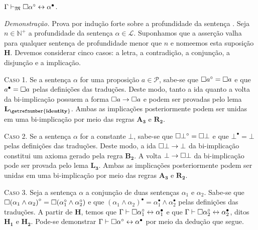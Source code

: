 \vspace{.5\baselineskip}
\begin{tcolorbox}[enhanced jigsaw, breakable, sharp corners, colframe=black, colback=white, boxrule=0.5pt, left=1.5mm, right=1.5mm, top=1.5mm, bottom=1.5mm]
\begin{theorem}\label{biimplication}
    $\Gamma\mathrel{\vdash}_\mathfrak{M}\Box\alpha^\circ\leftrightarrow\alpha^\bullet$.
\end{theorem}

        \emph{Demonstração.}
        Prova por indução forte sobre a profundidade da sentença \citep{Troelstra+Schwichtenberg.2000}.
        Seja $n\in\mathbb{N}^+$ a profundidade da sentença $\alpha\in\mathcal{L}$.
        Suponhamos que a asserção valha para qualquer sentença de profundidade menor que $n$ e nomeemos esta suposição $\mathbf{H}$.
        Devemos considerar cinco casos: a letra, a contradição, a conjunção, a disjunção e a implicação.

        \vspace{.5\baselineskip}
        \textsc{Caso 1.}
        Se a sentença $\alpha$ for uma proposição $a\in\mathcal{P}$, sabe-se que $\Box a^\circ=\Box a$ e que $a^\bullet=\Box a$ pelas definições das traduções.
        Deste modo, tanto a ida quanto a volta da bi-implicação possuem a forma $\Box a\to\Box a$ e podem ser provadas pelo lema \hyperref[identity]{$\mathbf{L_\getrefnumber{identity}}$}.
        Ambas as implicações posteriormente podem ser unidas em uma bi-implicação por meio das regras \hyperref[MA3]{$\mathbf{A_3}$} e \hyperref[modal.rule.2]{$\mathbf{R_2}$}.

        \vspace{.5\baselineskip}
        \textsc{Caso 2.}
        Se a sentença $\alpha$ for a constante $\bot$, sabe-se que $\Box\bot^\circ=\Box\bot$ e que $\bot^\bullet=\bot$ pelas definições das traduções.
        Deste modo, a ida $\Box\bot\to\bot$ da bi-implicação constitui um axioma gerado pela regra \hyperref[modal.axiom.modal.2]{$\mathbf{B_2}$}.
        A volta $\bot\to\Box\bot$ da bi-implicação pode ser provada pelo lema \hyperref[explosion]{$\mathbf{L_3}$}.
        Ambas as implicações posteriormente podem ser unidas em uma bi-implicação por meio das regras \hyperref[MA3]{$\mathbf{A_3}$} e \hyperref[modal.rule.2]{$\mathbf{R_2}$}.

        \vspace{.5\baselineskip}
        \textsc{Caso 3.}
        Seja a sentença $\alpha$ a conjunção de duas sentenças $\alpha_1$ e $\alpha_2$.
        Sabe-se que $\Box{(\alpha_1\wedge\alpha_2)}^\circ=\Box(\alpha_1^\circ\wedge\alpha_2^\circ)$ e que ${(\alpha_1\wedge\alpha_2)}^\bullet=\alpha_1^\bullet\wedge\alpha_2^\bullet$ pelas definições das traduções.
        A partir de $\mathbf{H}$, temos que $\Gamma\mathrel{\vdash}\Box\alpha_1^\circ\leftrightarrow\alpha_1^\bullet$ e que $\Gamma\mathrel{\vdash}\Box\alpha_2^\circ\leftrightarrow\alpha_2^\bullet$, ditos $\mathbf{H_1}$ e $\mathbf{H_2}$.
        Pode-se demonstrar $\Gamma\mathrel{\vdash}\Box\alpha^\circ\leftrightarrow\alpha^\bullet$ por meio da dedução que segue.


\end{tcolorbox}
